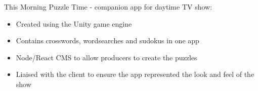 \item This Morning Puzzle Time - companion app for daytime TV show:
\begin{itemize}
    \item Created using the Unity game engine
    \item Contains crosswords, wordsearches and sudokus in one app
    \item Node/React CMS to allow producers to create the puzzles
    \item Liaised with the client to ensure the app represented the look and feel of the show
\end{itemize}
